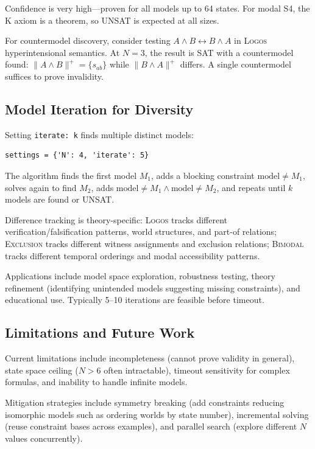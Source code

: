 \documentclass[pdflatex,sn-mathphys-num]{sn-jnl}
\newcommand{\verifierset}[1]{\|{#1}\|^+}    %
\newcommand{\theorylogos}{\textsc{Logos}}
\newcommand{\theoryexclusion}{\textsc{Exclusion}}
\newcommand{\theorybimodal}{\textsc{Bimodal}}
\theoremstyle{thmstyleone}
\theoremstyle{thmstyletwo}
\theoremstyle{thmstylethree}
\begin{document}
Confidence is very high---proven for all models up to 64 states.
For modal S4, the K axiom is a theorem, so UNSAT is expected at all sizes.

For countermodel discovery, consider testing $A \land B \leftrightarrow B \land A$ in \theorylogos{} hyperintensional semantics.
At $N=3$, the result is SAT with a countermodel found: $\verifierset{A \land B} = \{s_{ab}\}$ while $\verifierset{B \land A}$ differs.
A single countermodel suffices to prove invalidity.

\subsection{Model Iteration for Diversity}\label{sec:iteration}

Setting \texttt{iterate: k} finds multiple distinct models:
\begin{lstlisting}[caption={Model iteration}]
settings = {'N': 4, 'iterate': 5}
\end{lstlisting}

The algorithm finds the first model $M_1$, adds a blocking constraint $\text{model} \neq M_1$, solves again to find $M_2$, adds $\text{model} \neq M_1 \land \text{model} \neq M_2$, and repeats until $k$ models are found or UNSAT.

Difference tracking is theory-specific: \theorylogos{} tracks different verification/falsification patterns, world structures, and part-of relations; \theoryexclusion{} tracks different witness assignments and exclusion relations; \theorybimodal{} tracks different temporal orderings and modal accessibility patterns.

Applications include model space exploration, robustness testing, theory refinement (identifying unintended models suggesting missing constraints), and educational use.
Typically 5--10 iterations are feasible before timeout.

\subsection{Limitations and Future Work}\label{sec:finite-limitations}

Current limitations include incompleteness (cannot prove validity in general), state space ceiling ($N > 6$ often intractable), timeout sensitivity for complex formulas, and inability to handle infinite models.

Mitigation strategies include symmetry breaking (add constraints reducing isomorphic models such as ordering worlds by state number), incremental solving (reuse constraint bases across examples), and parallel search (explore different $N$ values concurrently).
\end{document}
